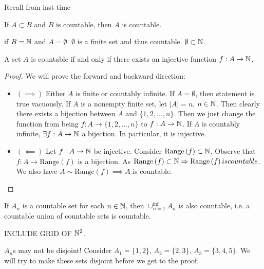 
Recall from last time
\begin{theorem}
	If $A \subset B$ and $B$ is countable, then $A$ is countable.
\end{theorem}

\begin{note}
	if $B = \mathbb{N}$ and $A = \emptyset$.  $\emptyset$ is a finite set and thus countable. $\emptyset \subset  \mathbb{N}$.
\end{note}

\begin{theorem}
	A set $A$ is countable if and only if there exists an injective function $f:A \to \mathbb{N}$.
\end{theorem}

\begin{proof}
	We will prove the forward and backward direction:
	\begin{itemize}
		\item $\left( \implies \right) $ Either $A$ is finite or countably infinite. If $A = \emptyset$, then statement is true vacuously. If $A$ is a nonempty finite set, let $\left|A\right| = n$, $n \in \mathbb{N}$. Then clearly there exists a bijection between $A$ and $\{1, 2, \ldots, n\}$. Then we just change the function from being $f: A \to \{1, 2, \ldots, n\}$ to $f: A \to \mathbb{N}$. If  $A$ is countably infinite, $\exists f: A \to \mathbb{N}$ a bijection. In particular, it is injective.
		\item $\left( \impliedby \right) $ Let $f: A \to \mathbb{N}$ be injective. Consider $\text{Range}\left( f \right) \subset \mathbb{N}$. Observe that $f: A \to \text{Range}\left( f \right) $ is a bijection. As $\text{Range}\left( f \right) \subset \mathbb{N} \Rightarrow \text{Range}\left( f \right)  is countable$. We also have $A \sim \text{Range}\left( f \right) \implies A$ is countable.
	\end{itemize}
\end{proof}

\begin{theorem}
	If $A_n$ is a countable set for each $n \in \mathbb{N}$, then $\cup_{n=1}^{\inf} A_n$ is also countable, i.e. a countable union of countable sets is countable.
\end{theorem}

INCLUDE GRID OF $\mathbb{N}^{2}$.

\begin{note}
	$A_n$s may not be disjoint! Consider $A_1 = \{1, 2\}$, $A_2 = \{2, 3\}$,  $A_3 = \{3, 4, 5\}$. We will try to make these sets disjoint before we get to the proof.
\end{note}

